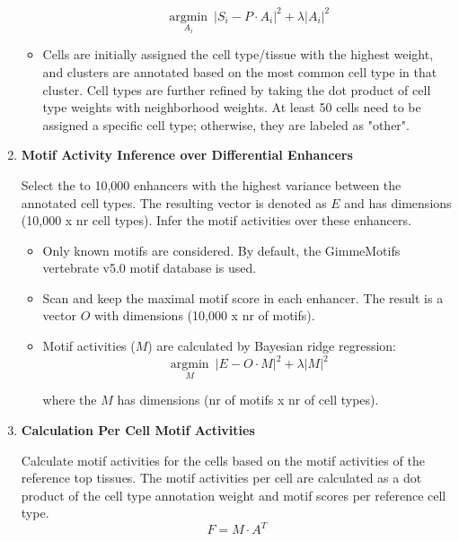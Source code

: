 \begin{enumerate}
\begin{itemize}
        \begin{equation*}
            \underset{A_i}{\operatorname{argmin}}\ |S_i - P \cdot A_i|^2 + \lambda |A_i|^2
        \end{equation*}
        
        \item Cells are initially assigned the cell type/tissue with the highest weight, and clusters are annotated based on the most common cell type in that cluster. Cell types are further refined by taking the dot product of cell type weights with neighborhood weights. At least 50 cells need to be assigned a specific cell type; otherwise, they are labeled as "other".
    \end{itemize}

    \item \textbf{Motif Activity Inference over Differential Enhancers}
    
    Select the to 10,000 enhancers with the highest variance between the annotated cell types. The resulting vector is denoted as $E$ and has dimensions (10,000 x nr cell types). Infer the motif activities over these enhancers. 
    
    \begin{itemize}
        \item Only known motifs are considered. By default, the GimmeMotifs\cite{Bruse_2018} vertebrate v5.0 motif database is used.
        \item Scan and keep the maximal motif score in each enhancer. The result is a vector $O$ with dimensions (10,000 x nr of motifs).
        \item Motif activities ($M$) are calculated by Bayesian ridge regression:
        \begin{equation*}
            \underset{M}{\operatorname{argmin}}\ |E - O \cdot M|^2 + \lambda |M|^2
        \end{equation*}

        where the $M$ has dimensions (nr of motifs x nr of cell types).
    \end{itemize}

    \item \textbf{Calculation Per Cell Motif Activities}
    
    Calculate motif activities for the cells based on the motif activities of the reference top tissues. The motif activities per cell are calculated as a dot product of the cell type annotation weight and motif scores per reference cell type.
    \begin{equation*}
        F = M \cdot A^T
    \end{equation*}


\end{enumerate}
